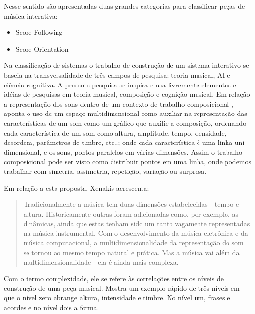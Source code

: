 \documentclass{ppgmus}
\begin{document}
Nesse sentido são apresentadas duas grandes categorias para classificar peças
de música interativa:

\begin{itemize}
 \item Score Following
  \item Score Orientation
\end{itemize}








Na classificação de sistemas \cite{rowe93:interactive} o trabalho de construção de um sistema interativo se
baseia na transversalidade de  três campos de pesquisa: teoria
musical, AI e ciência cognitiva. A presente pesquisa se inspira e usa
livremente elementos e idéias de pesquisas em teoria musical,
composição e cognição musical. Em relação a representação dos sons
dentro de um contexto de trabalho composicional \cite{xenakis96:determinacy}, aponta o
uso de um espaço multidimensional como auxiliar na representação das
características de um som como um gráfico que auxilie a composição,
ordenando cada característica de um som  como altura, amplitude,
tempo, densidade, desordem, parâmetros de timbre, etc..; onde cada
característica é uma linha uni-dimensional, e os sons, pontos
paralelos em várias dimensões. Assim o trabalho composicional pode ser
visto como distribuir pontos em uma linha, onde podemos trabalhar com
simetria, assimetria, repetição, variação ou surpresa.

Em relação a esta proposta, Xenakis acrescenta: 

\begin{quote}
Tradicionalmente a música tem duas dimensões estabelecidas - tempo e
altura. Historicamente outras foram adicionadas como, por exemplo, as
dinâmicas, ainda que estas tenham sido um tanto vagamente
representadas na música instrumental. Com o desenvolvimento da música
eletrônica e da música computacional, a multidimensionalidade da
representação do som se tornou ao mesmo tempo natural e prática. Mas a
música vai além da multidimensionalidade - ela é ainda mais complexa. \cite{xenakis96:determinacy}
  
\end{quote} 

Com o termo complexidade, ele se refere às correlações entre os níveis
de construção de uma peça musical. Mostra um exemplo rápido de três
níveis em que o nível zero abrange altura, intensidade e timbre. No
nível um, frases e acordes e no nível dois a forma.
\end{document}
